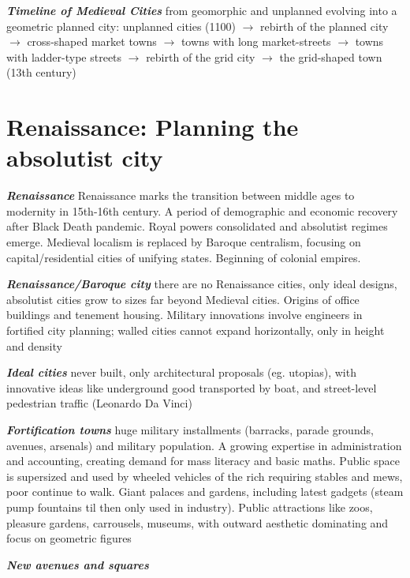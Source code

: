 \documentclass{article}
\newcommand{\bisection}[1]{\textbf{\textit{#1}}}
\begin{document}
\bisection{Timeline of Medieval Cities} from geomorphic and unplanned evolving into a geometric planned city: unplanned cities (1100) $\rightarrow$ rebirth of the planned city $\rightarrow$ cross-shaped market towns $\rightarrow$ towns with long market-streets $\rightarrow$ towns with ladder-type streets $\rightarrow$ rebirth of the grid city $\rightarrow$ the grid-shaped town (13th century)

\pagebreak
\section{Renaissance: Planning the absolutist city}

\bisection{Renaissance} Renaissance marks the transition between middle ages to modernity in 15th-16th century. A period of demographic and economic recovery after Black Death pandemic. Royal powers consolidated and absolutist regimes emerge. Medieval localism is replaced by Baroque centralism, focusing on capital/residential cities of unifying states. Beginning of colonial empires.

\bisection{Renaissance/Baroque city} there are no Renaissance cities, only ideal designs, absolutist cities grow to sizes far beyond Medieval cities. Origins of office buildings and tenement housing. Military innovations involve engineers in fortified city planning; walled cities cannot expand horizontally, only in height and density

\bisection{Ideal cities} never built, only architectural proposals (eg. utopias), with innovative ideas like underground good transported by boat, and street-level pedestrian traffic (Leonardo Da Vinci)

\bisection{Fortification towns} huge military installments (barracks, parade grounds, avenues, arsenals) and military population. A growing expertise in administration and accounting, creating demand for mass literacy and basic maths. Public space is supersized and used by wheeled vehicles of the rich requiring stables and mews, poor continue to walk. Giant palaces and gardens, including latest gadgets (steam pump fountains til then only used in industry). Public attractions like zoos, pleasure gardens, carrousels, museums, with outward aesthetic dominating and focus on geometric figures


\bisection{New avenues and squares} 
\end{document}
